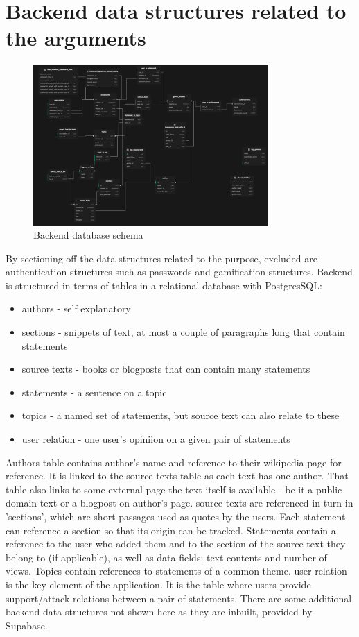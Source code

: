 \documentclass{report}
\begin{document}
\section{Backend data structures related to the arguments}

\begin{figure}[h]
    \centering
    \includegraphics[width=0.8\textwidth]{./images/Supabase-Schema-2.png}
    \caption{Backend database schema}
\end{figure}

By sectioning off the data structures related to the purpose, excluded are authentication structures such as passwords and gamification structures.
Backend is structured in terms of tables in a relational database with PostgresSQL:
\begin{itemize}
  \item authors - self explanatory
  \item sections - snippets of text, at most a couple of paragraphs long that contain statements
  \item source texts - books or blogposts that can contain many statements
  \item statements - a sentence on a topic
  \item topics - a named set of statements, but source text can also relate to these
  \item user relation - one user's opiniion on a given pair of statements
\end{itemize}
Authors table contains author's name and reference to their wikipedia page for reference. It is linked to the source texts table as each text has one author. That table also links to some external page the text itself is available - be it a public domain text or a blogpost on author's page. source texts are referenced in turn in 'sections', which are short passages used as quotes by the users.
Each statement can reference a section so that its origin can be tracked. Statements contain a reference to the user who added them and to the section of the source text they belong to (if applicable), as well as data fields: text contents and number of views. Topics contain references to statements of a common theme.
user relation is the key element of the application. It is the table where users provide support/attack relations between a pair of statements. 
There are some additional backend data structures not shown here as they are inbuilt, provided by Supabase.
\end{document}
